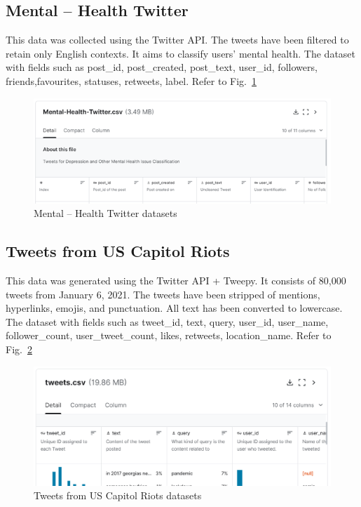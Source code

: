 \documentclass[conference]{IEEEtran}
\begin{document}
\subsection{Mental – Health Twitter}
This data was collected using the Twitter API.
The tweets have been filtered to retain only English contexts. It aims to classify users' mental health.
The dataset with fields such as post\_id, post\_created, post\_text, user\_id, followers, friends,favourites, statuses, retweets, label. Refer to Fig.~\ref{fig2}

\begin{figure}[htbp]
    \centerline{\includegraphics[scale=0.5]{fig2.png}}
    \caption{Mental – Health Twitter datasets}
    \label{fig2}
\end{figure}

\subsection{Tweets from US Capitol Riots}
This data was generated using the Twitter API + Tweepy. It consists of 80,000 tweets from January 6, 2021. The tweets have been stripped of mentions, hyperlinks, emojis, and punctuation. All text has been converted to lowercase.
The dataset with fields such as tweet\_id, text, query, user\_id, user\_name, follower\_count, user\_tweet\_count, likes, retweets, location\_name. Refer to Fig.~\ref{fig3}

\begin{figure}[htbp]
    \centerline{\includegraphics[scale=0.3]{fig3.png}}
    \caption{Tweets from US Capitol Riots datasets}
    \label{fig3}
\end{figure}
\end{document}
